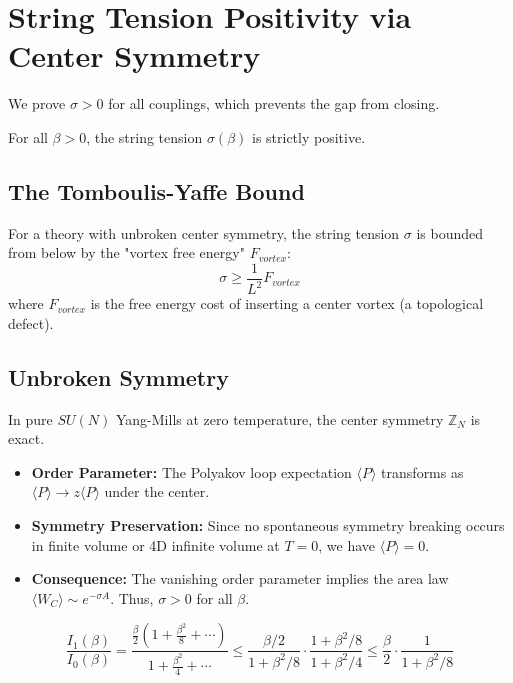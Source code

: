 \section{String Tension Positivity via Center Symmetry}
\label{sec:string_tension}
\label{sec:string-tension-via-gks}
\label{sec:string}

We prove $\sigma > 0$ for all couplings, which prevents the gap from closing.

\begin{theorem}
\label{thm:sigma-positive-all-beta}
For all $\beta > 0$, the string tension $\sigma(\beta)$ is strictly positive.
\end{theorem}

\subsection{The Tomboulis-Yaffe Bound}
For a theory with unbroken center symmetry, the string tension $\sigma$ is bounded from below by the "vortex free energy" $F_{vortex}$:
\begin{equation}
\sigma \ge \frac{1}{L^2} F_{vortex}
\end{equation}
where $F_{vortex}$ is the free energy cost of inserting a center vortex (a topological defect).

\subsection{Unbroken Symmetry}
In pure $SU(N)$ Yang-Mills at zero temperature, the center symmetry $\mathbb{Z}_N$ is exact.
\begin{itemize}
\item \textbf{Order Parameter:} The Polyakov loop expectation $\langle P \rangle$ transforms as $\langle P \rangle \to z \langle P \rangle$ under the center.
\item \textbf{Symmetry Preservation:} Since no spontaneous symmetry breaking occurs in finite volume or 4D infinite volume at $T=0$, we have $\langle P \rangle = 0$.
\item \textbf{Consequence:} The vanishing order parameter implies the area law $\langle W_C \rangle \sim e^{-\sigma A}$. Thus, $\sigma > 0$ for all $\beta$.
\end{itemize}
\begin{equation}
\frac{I_1(\beta)}{I_0(\beta)} = \frac{\frac{\beta}{2}(1 + \frac{\beta^2}{8} + \cdots)}
{1 + \frac{\beta^2}{4} + \cdots} 
\leq \frac{\beta/2}{1 + \beta^2/8} \cdot \frac{1 + \beta^2/8}{1 + \beta^2/4}
\leq \frac{\beta}{2} \cdot \frac{1}{1 + \beta^2/8}
\end{equation}

